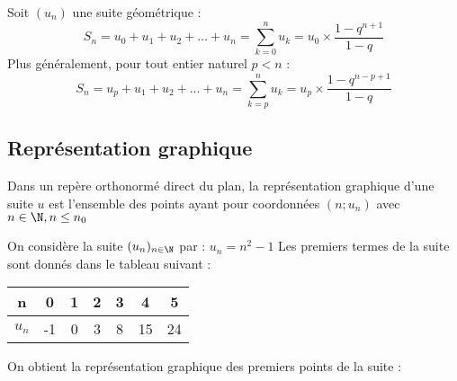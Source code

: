 \documentclass[11pt]{article}
\begin{document}
\begin{theoreme}
Soit $(u_n)$ une suite géométrique :
\[ S_n = u_0 + u_1 + u_2 + \ldots + u_n = \sum_{k=0}^{n} u_k = u_0
\times \dfrac{1-q^{n+1}}{1-q} \]
Plus généralement, pour tout entier naturel $p<n$ :
\[ S_n = u_p + u_1 + u_2 + \ldots + u_n = \sum_{k=p}^{n} u_k = u_p
\times \dfrac{1-q^{n-p+1}}{1-q} \]
\end{theoreme}

\subsection{Représentation graphique}

\begin{definition}
Dans un repère orthonormé direct du plan, la représentation graphique
d'une suite $u$ est l'ensemble des points ayant pour coordonnées
$(n;u_n)$ avec $n \in \N, n \leq n_0$ 
\end{definition}

\begin{exemple}
On considère la suite $(u_n)_{n\in\N}$ par : $u_n = n^2 - 1$  
Les premiers termes de la suite sont donnés dans le tableau suivant :
\begin{center}
\begin{tabular}{|c|c|c|c|c|c|c|}
\hline
\textbf{n} & 0 & 1 & 2 & 3 & 4 & 5 \\ \hline
\textbf{$u_n$} & -1 & 0 & 3 & 8 & 15 & 24 \\ \hline
\end{tabular}
\end{center}
On obtient la représentation graphique des premiers points de la suite
:
\begin{center}
\end{center}
\end{exemple}
\end{document}
